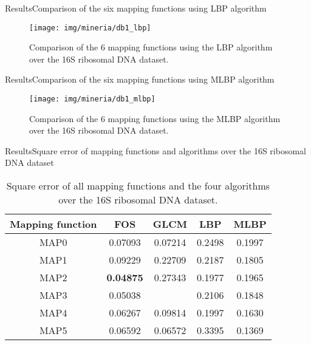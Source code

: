 \documentclass[10pt]{beamer}
\newcommand{\1}{
	\setbeamertemplate{background}{
		\texttt{[image: img/1]}
		\tikz[overlay] \fill[fill opacity=0.75,fill=white] (0,0) rectangle (-\paperwidth,\paperheight);
	}
}
\begin{document}
\begin{frame}{Results}{Comparison of the six mapping functions using LBP algorithm}
	\begin{figure}[]
		\centering
		\texttt{[image: img/mineria/db1\_lbp]}
		\caption{Comparison of the 6 mapping functions using the LBP algorithm over the 16S ribosomal DNA dataset.}
		\label{img:comp3}
	\end{figure}
\end{frame}

\begin{frame}{Results}{Comparison of the six mapping functions using MLBP algorithm}
	\begin{figure}[]
		\centering
		\texttt{[image: img/mineria/db1\_mlbp]}
		\caption{Comparison of the 6 mapping functions using the MLBP algorithm over the 16S ribosomal DNA dataset.}
		\label{img:comp3}
	\end{figure}
\end{frame}


\begin{frame}{Results}{Square error of mapping functions and algorithms over the 16S ribosomal DNA dataset}
\begin{table}[hbt!]
	\centering
	\caption{Square error of all mapping functions and the four algorithms over the 16S ribosomal DNA dataset.}
	\label{tab:comparison_score_db1}
	\setlength{\tabcolsep}{0.5em} %
	{\renewcommand{\arraystretch}{1}%
		\begin{tabular}{ccccc}
			\hline
			Mapping function    & FOS  & GLCM & LBP & MLBP \\ \hline
			MAP0 				& 0.07093 & 0.07214 & 0.2498 & 0.1997  \\
			MAP1 				& 0.09229 & 0.22709 & 0.2187 & 0.1805  \\
			MAP2 				& \textbf{0.04875} & 0.27343 & 0.1977 & 0.1965  \\
			MAP3 				& 0.05038 & 		 & 0.2106 & 0.1848  \\
			MAP4 				& 0.06267 & 0.09814 & 0.1997 & 0.1630  \\
			MAP5 				& 0.06592 & 0.06572 & 0.3395 & 0.1369  \\ \hline
		\end{tabular}
	}
\end{table}
\end{frame}
\end{document}
